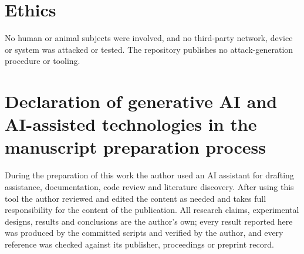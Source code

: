 \section*{Ethics}

\noindent No human or animal subjects were involved, and no third-party network, device or
system was attacked or tested. The repository publishes no attack-generation procedure or
tooling.

\section*{Declaration of generative AI and AI-assisted technologies in the manuscript
preparation process}

\noindent During the preparation of this work the author used an AI assistant for drafting
assistance, documentation, code review and literature discovery. After using this tool the
author reviewed and edited the content as needed and takes full responsibility for the content
of the publication. All research claims, experimental designs, results and conclusions are the
author's own; every result reported here was produced by the committed scripts and verified by
the author, and every reference was checked against its publisher, proceedings or preprint
record.


